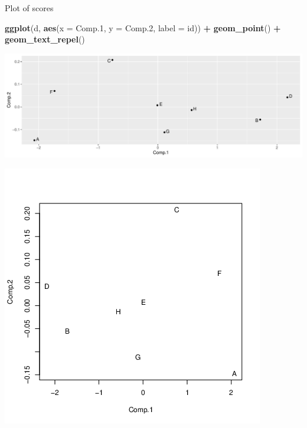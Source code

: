 \documentclass[
  ignorenonframetext,
]{beamer}
\newenvironment{Shaded}{\begin{snugshade}}{\end{snugshade}}
\newcommand{\DataTypeTok}[1]{\textcolor[rgb]{0.13,0.29,0.53}{#1}}
\newcommand{\FloatTok}[1]{\textcolor[rgb]{0.00,0.00,0.81}{#1}}
\newcommand{\KeywordTok}[1]{\textcolor[rgb]{0.13,0.29,0.53}{\textbf{#1}}}
\newcommand{\NormalTok}[1]{#1}
\newcommand{\OperatorTok}[1]{\textcolor[rgb]{0.81,0.36,0.00}{\textbf{#1}}}
\newcommand{\StringTok}[1]{\textcolor[rgb]{0.31,0.60,0.02}{#1}}
\begin{document}
\begin{frame}[fragile]{Plot of scores}
\protect\hypertarget{plot-of-scores}{}

\begin{Shaded}
\begin{Highlighting}[]
\KeywordTok{ggplot}\NormalTok{(d, }\KeywordTok{aes}\NormalTok{(}\DataTypeTok{x =}\NormalTok{ Comp}\FloatTok{.1}\NormalTok{, }\DataTypeTok{y =}\NormalTok{ Comp}\FloatTok{.2}\NormalTok{, }\DataTypeTok{label =}\NormalTok{ id)) }\OperatorTok{+}
\StringTok{  }\KeywordTok{geom_point}\NormalTok{() }\OperatorTok{+}\StringTok{ }\KeywordTok{geom_text_repel}\NormalTok{()}
\end{Highlighting}
\end{Shaded}

\includegraphics{slides_d29_files/figure-beamer/score-plot-1.pdf}

\includegraphics{bPrincomp-score-plot.png}

\end{frame}
\end{document}
